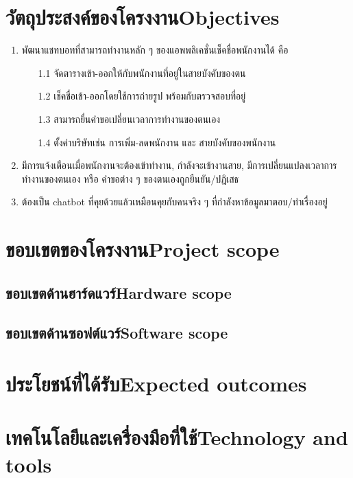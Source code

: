 \section{\ifcpe วัตถุประสงค์ของโครงงาน\else Objectives\fi}
\begin{enumerate}
    \item พัฒนาแชทบอทที่สามารถทำงานหลัก ๆ ของแอพพลิเคชั่นเช็คชื่อพนักงานได้ คือ 
    \begin{enumerate}
    \item[1.1] จัดตารางเข้า-ออกให้กับพนักงานที่อยู่ในสายบังคับของตน
    \item[1.2] เช็คชื่อเข้า-ออกโดยใช้การถ่ายรูป พร้อมกับตรวจสอบที่อยู่ 
    \item[1.3] สามารถยื่นคำขอเปลี่ยนเวลาการทำงานของตนเอง
    \item[1.4] ตั้งค่าบริษัทเช่น การเพิ่ม-ลดพนักงาน และ สายบังคับของพนักงาน 
    \end{enumerate} 
    \item มีการแจ้งเตือนเมื่อพนักงานจะต้องเข้าทำงาน, กำลังจะเข้างานสาย, มีการเปลี่ยนแปลงเวลาการทำงานของตนเอง หรือ คำขอต่าง ๆ ของตนเองถูกยืนยัน/ปฎิเสธ
    \item ต้องเป็น chatbot ที่คุยด้วยแล้วเหมือนคุยกับคนจริง ๆ ที่กำลังหาข้อมูลมาตอบ/ทำเรื่องอยู่
\end{enumerate}

\section{\ifcpe ขอบเขตของโครงงาน\else Project scope\fi}

\subsection{\ifcpe ขอบเขตด้านฮาร์ดแวร์\else Hardware scope\fi}

\subsection{\ifcpe ขอบเขตด้านซอฟต์แวร์\else Software scope\fi}

\section{\ifcpe ประโยชน์ที่ได้รับ\else Expected outcomes\fi}

\section{\ifcpe เทคโนโลยีและเครื่องมือที่ใช้\else Technology and tools\fi}

